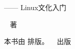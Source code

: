 \thispagestyle{empty}
\makeatletter

\begin{center}


{\fontsize{2cm}{2.5cm}\selectfont \xingkai{} \@title

 \vskip 2cm
 
\normalfont  \large  ------ Linux文化入门 
 
}


\vskip 5cm

 {\LARGE
  \@author ~ 著 }


\end{center}

\null
\vfill


\begin{flushright}
本书由 \XeLaTeX{} 排版。 \hfill \@publisher ~ 出版
\end{flushright}

\makeatother
